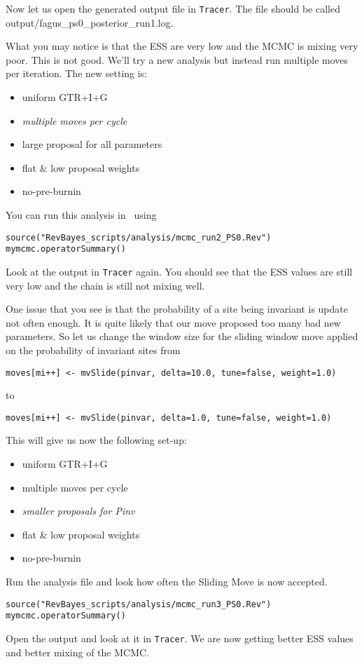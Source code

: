 Now let us open the generated output file in \verb!Tracer!.
The file should be called output/fagus\_ps0\_posterior\_run1.log.

What you may notice is that the ESS are very low and the MCMC is mixing very poor.
This is not good. 
We'll try a new analysis but instead run multiple moves per iteration.
The new setting is:
\begin{itemize}
\item{uniform GTR+I+G}
\item{\it multiple moves per cycle}
\item{large proposal for all parameters}
\item{flat \& low proposal weights}
\item{no-pre-burnin}
\end{itemize}
You can run this analysis in \RevBayes~using
{\tt \begin{snugshade*}
\begin{lstlisting}
source("RevBayes_scripts/analysis/mcmc_run2_PS0.Rev")
mymcmc.operatorSummary()
\end{lstlisting}
\end{snugshade*}}
Look at the output in \verb!Tracer! again.
You should see that the ESS values are still very low and the chain is still not mixing well.

One issue that you see is that the probability of a site being invariant is update not often enough.
It is quite likely that our move proposed too many bad new parameters.
So let us change the window size for the sliding window move applied on the probability of invariant sites from
{\tt \begin{snugshade*}
\begin{lstlisting}
moves[mi++] <- mvSlide(pinvar, delta=10.0, tune=false, weight=1.0)
\end{lstlisting}
\end{snugshade*}}
to
{\tt \begin{snugshade*}
\begin{lstlisting}
moves[mi++] <- mvSlide(pinvar, delta=1.0, tune=false, weight=1.0)
\end{lstlisting}
\end{snugshade*}}
This will give us now the following set-up:
\begin{itemize}
\item{uniform GTR+I+G}
\item{multiple moves per cycle}
\item{\it smaller proposals for Pinv}
\item{flat \& low proposal weights}
\item{no-pre-burnin}
\end{itemize}
Run the analysis file and look how often the Sliding Move is now accepted.
{\tt \begin{snugshade*}
\begin{lstlisting}
source("RevBayes_scripts/analysis/mcmc_run3_PS0.Rev")
mymcmc.operatorSummary()
\end{lstlisting}
\end{snugshade*}}
Open the output and look at it in \verb!Tracer!.
We are now getting better ESS values and better mixing of the MCMC.

